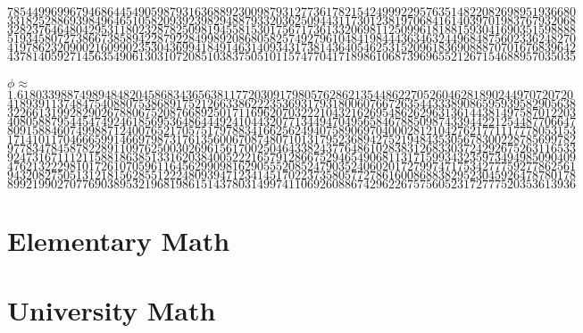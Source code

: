 \documentclass{tufte-book}
\begin{document}
$7854499699679468644549059879316368892300987931277361782154249992295763514822082698951936680$\\
$3318252886939849646510582093923982948879332036250944311730123819706841614039701983767932068$\\
$3282376464804295311802328782509819455815301756717361332069811250996181881593041690351598888$\\
$5193458072738667385894228792284998920868058257492796104841984443634632449684875602336248270$\\
$4197862320900216099023530436994184914631409343173814364054625315209618369088870701676839642$\\
$4378140592714563549061303107208510383750510115747704171898610687396965521267154688957035035$
\\~\\
$\phi\approx$\\
$1.61803398874989484820458683436563811772030917980576286213544862270526046281890244970720720$\\
$4189391137484754088075386891752126633862223536931793180060766726354433389086595939582905638$\\
$3226613199282902678806752087668925017116962070322210432162695486262963136144381497587012203$\\
$4080588795445474924618569536486444924104432077134494704956584678850987433944221254487706647$\\
$8091588460749988712400765217057517978834166256249407589069704000281210427621771117778053153$\\
$1714101170466659914669798731761356006708748071013179523689427521948435305678300228785699782$\\
$9778347845878228911097625003026961561700250464338243776486102838312683303724292675263116533$\\
$9247316711121158818638513316203840052221657912866752946549068113171599343235973494985090409$\\
$4762132229810172610705961164562990981629055520852479035240602017279974717534277759277862561$\\
$9432082750513121815628551222480939471234145170223735805772786160086883829523045926478780178$\\
$8992199027077690389532196819861514378031499741106926088674296226757560523172777520353613936$

\mainmatter

\part{Elementary Math}

\part{University Math}




\end{document}
